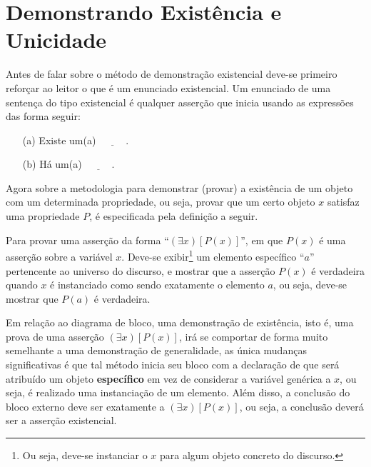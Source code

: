 \section{Demonstrando Existência e Unicidade}\label{sec:DemonstrandoExistencia}

Antes de falar sobre o método de demonstração existencial deve-se primeiro reforçar ao leitor o que é um enunciado existencial. Um enunciado de uma sentença do tipo existencial é qualquer asserção que inicia usando as expressões das forma seguir:
\begin{itemize}
	\item[(a)] Existe um(a) $\underline{\ \ \ \ \ \ \ \ \ \ \ \ }$.
	\item[(b)] Há um(a) $\underline{\ \ \ \ \ \ \ \ \ \ \ \ }$.
\end{itemize} 

Agora sobre a metodologia para demonstrar (provar) a existência de um objeto com um determinada propriedade, ou seja, provar que um certo objeto $x$ satisfaz uma propriedade $P$,  é especificada pela definição a seguir.

\begin{definicao}
  Para provar uma asserção da forma ``$(\exists x)[P(x)]$'', em que $P(x)$ é uma asserção sobre a variável $x$. Deve-se exibir\footnote{Ou seja, deve-se instanciar o $x$ para algum objeto concreto do discurso.} um elemento específico ``$a$'' pertencente ao universo do discurso, e mostrar que a asserção $P(x)$ é verdadeira quando $x$ é instanciado como sendo exatamente o elemento $a$, ou seja, deve-se mostrar que $P(a)$ é verdadeira.
\end{definicao}

Em relação ao diagrama de bloco, uma demonstração de existência, isto é, uma prova de uma asserção $(\exists x)[P(x)]$,  irá se comportar de forma muito semelhante a uma demonstração de generalidade, as única mudanças significativas é que tal método inicia seu bloco com a declaração de que será atribuído um objeto \textbf{específico} em vez de considerar a variável genérica a $x$, ou seja, é realizado uma instanciação de um elemento. Além disso, a conclusão do bloco externo deve ser exatamente a $(\exists x)[P(x)]$, ou seja, a conclusão deverá ser a asserção existencial.

